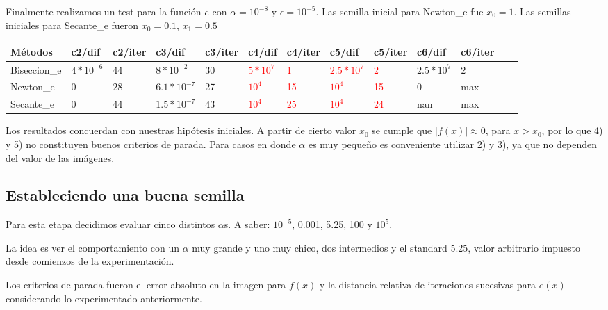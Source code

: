 Finalmente realizamos un test para la función $e$ con $\alpha = 10^{-8}$ y $\epsilon = 10^{-5}$. Las semilla inicial para Newton\_e fue $x_{0}=1$. Las semillas iniciales para Secante\_e fueron $x_{0} = 0.1$, 
$x_{1} = 0.5$

\begin{center}
    \small{
    \begin{tabular}{| l | l | l | l | l | l | l | l | l | l | l | l | l |}
    \hline
    Métodos & c2/dif & c2/iter & c3/dif & c3/iter & c4/dif & c4/iter & c5/dif & c5/iter & c6/dif & c6/iter \\ \hline
    Biseccion\_e & $4*10^{-6}$ & 44 & $8*10^{-2}$ & 30 & \textcolor{red}{$5*10^{7}$} & \textcolor{red}{1} & \textcolor{red}{$2.5*10^{7}$} & \textcolor{red}{2} & {$2.5*10^{7}$} & 2  \\ \hline
    Newton\_e & 0 & 28 & $6.1*10^{-7}$ & 27 & \textcolor{red}{$10^{4}$} & \textcolor{red}{15} & \textcolor{red}{$10^{4}$} & \textcolor{red}{15} & 0 & max \\ \hline
    Secante\_e & 0 & 44 & $1.5*10^{-7}$ & 43 & \textcolor{red}{$10^{4}$} & \textcolor{red}{25} & \textcolor{red}{$10^{4}$} & \textcolor{red}{24} & nan & max   \\ \hline
    \end{tabular}
    }
\end{center}

Los resultados concuerdan con nuestras hipótesis iniciales. A partir de cierto valor $x_0$ se cumple que $|f(x)| \approx 0$, para $x>x_{0}$, por lo que 4) y 5) no constituyen buenos
criterios de parada. Para casos en donde $\alpha$ es muy peque\~no es conveniente utilizar 2) y 3), ya que no dependen del valor de las imágenes.

\subsection{Estableciendo una buena semilla}

Para esta etapa decidimos evaluar cinco distintos $\alpha$s. A saber: $10^{-5}$, 0.001, 5.25, 100 y $10^5$.

La idea es ver el comportamiento con un $\alpha$ muy grande y uno muy chico, dos intermedios y el standard 5.25, valor arbitrario impuesto desde comienzos de la experimentación.

Los criterios de parada fueron el error absoluto en la imagen para $f(x)$ y la distancia relativa de iteraciones sucesivas para $e(x)$ considerando lo experimentado anteriormente.

